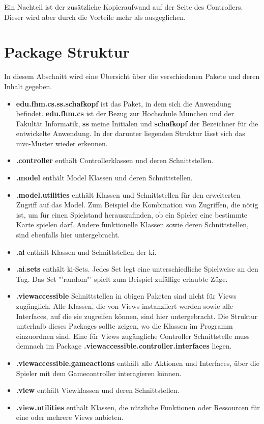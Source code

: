 \documentclass[
							a4paper, 
							11pt, 
							openany, 
							liststotoc,
							parskip=half, 
   							headings=normal
						]{scrreprt}
\begin{document}
{Ein Nachteil ist der zusätzliche Kopieraufwand auf der Seite des Controllers. Dieser wird aber durch die Vorteile mehr als ausgeglichen.

\clearpage

\section{Package Struktur} \label{se:anwendung_package_structure}
In diesem Abschnitt wird eine Übersicht über die verschiedenen Pakete und deren Inhalt gegeben.
\begin{itemize}
	\item \textbf{edu.fhm.cs.ss.schafkopf} ist das Paket, in dem sich die Anwendung befindet. \textbf{edu.fhm.cs} ist der Bezug zur Hochschule München und der Fakultät Informatik, \textbf{ss} meine Initialen und \textbf{schafkopf} der Bezeichner für die entwickelte Anwendung. In der darunter liegenden Struktur lässt sich das \acs{mvc}-Muster wieder erkennen.
	\item \textbf{.controller} enthält Controllerklassen und deren Schnittstellen.
	\item \textbf{.model} enthält Model Klassen und deren Schnittstellen.
	\item \textbf{.model.utilities} enthält Klassen und Schnittstellen für den erweiterten Zugriff auf das Model. Zum Beispiel die Kombination von Zugriffen, die nötig ist, um für einen Spielstand herauszufinden, ob ein Spieler eine bestimmte Karte spielen darf. Andere funktionelle Klassen sowie deren Schnittstellen, sind ebenfalls hier untergebracht.
	\item \textbf{.ai} enthält Klassen und Schnittstellen der \acs{ki}.
	\item \textbf{.ai.sets} enthält \acs{ki}-Sets. Jedes Set legt eine unterschiedliche Spielweise an den Tag. Das Set "'random"' spielt zum Beispiel zufällige erlaubte Züge.
	\item \textbf{.viewaccessible} Schnittstellen in obigen Paketen sind nicht für Views zugänglich. Alle Klassen, die von Views instanziiert werden sowie alle Interfaces, auf die sie zugreifen können, sind hier untergebracht. Die Struktur unterhalb dieses Packages sollte zeigen, wo die Klassen im Programm einzuordnen sind. Eine für Views zugängliche Controller Schnittstelle muss demnach im Package \textbf{.view\-ac\-ces\-si\-ble\-.con\-trol\-ler.in\-ter\-fa\-ces} liegen.
	\item \textbf{.viewaccessible.gameactions} enthält alle Aktionen und Interfaces, über die Spieler mit dem Gamecontroller interagieren können.
	\item \textbf{.view} enthält Viewklassen und deren Schnittstellen.
	\item \textbf{.view.utilities} enthält Klassen, die nützliche Funktionen oder Ressourcen für eine oder mehrere Views anbieten.
\end{itemize}

}
\end{document}
